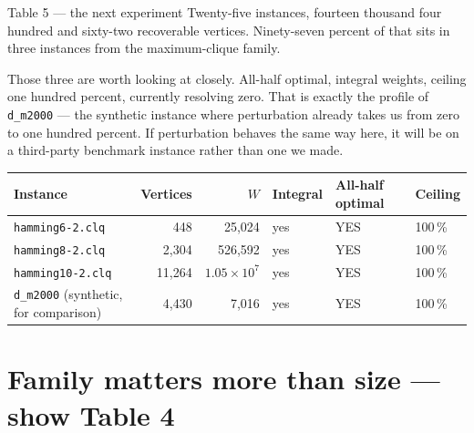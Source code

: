 \documentclass[11pt,a4paper]{article}
\begin{document}
\begin{say}{Table 5 --- the next experiment}
Twenty-five instances, fourteen thousand four hundred and sixty-two recoverable vertices. Ninety-seven
percent of that sits in three instances from the maximum-clique family.

Those three are worth looking at closely. All-half optimal, integral weights, ceiling one hundred
percent, currently resolving zero. That is exactly the profile of \texttt{d\_m2000} --- the synthetic
instance where perturbation already takes us from zero to one hundred percent. If perturbation
behaves the same way here, it will be on a third-party benchmark instance rather than one we made.
\end{say}

\begin{center}
\begin{tabular}{@{}lrrlll@{}}
\toprule
Instance & Vertices & $W$ & Integral & All-half optimal & Ceiling \\
\midrule
\texttt{hamming6-2.clq}  &    448 & 25{,}024 & yes & YES & 100\,\% \\
\texttt{hamming8-2.clq}  &  2{,}304 & 526{,}592 & yes & YES & 100\,\% \\
\texttt{hamming10-2.clq} & 11{,}264 & $1.05\times10^{7}$ & yes & YES & 100\,\% \\
\midrule
\texttt{d\_m2000} (synthetic, for comparison) & 4{,}430 & 7{,}016 & yes & YES & 100\,\% \\
\bottomrule
\end{tabular}
\end{center}

\section{Family matters more than size --- show Table 4}
\end{document}
